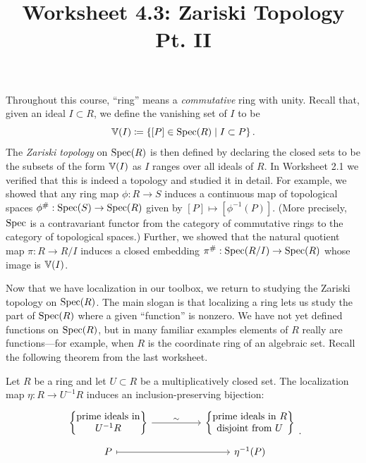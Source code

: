 \documentclass[12pt,reqno]{amsart}
\title{Worksheet 4.3: Zariski Topology Pt. II}
\begin{document}

\maketitle
\thispagestyle{firstpage2}

Throughout this course, ``ring'' means a \textit{commutative} ring with unity. Recall that, given an ideal $I \subset R$, we define the vanishing set of $I$ to be
\[
\mathbb{V}(I) \coloneqq \left\{[P] \in \operatorname{Spec}(R) \;\middle|\; I \subset P\right\}.
\]
The \emph{Zariski topology} on $\operatorname{Spec}(R)$ is then defined by declaring the closed sets to be the subsets of the form $\mathbb{V}(I)$ as $I$ ranges over all ideals of $R$. In Worksheet 2.1 we verified that this is indeed a topology and studied it in detail. For example, we showed that any ring map $\phi:R \to S$ induces a continuous map of topological spaces $\phi^{\#}: \operatorname{Spec}(S) \to \operatorname{Spec}(R)$ given by $[P] \mapsto [\phi^{-1}(P)]$. (More precisely, $\operatorname{Spec}$ is a contravariant functor from the category of commutative rings to the category of topological spaces.) Further, we showed that the natural quotient map $\pi:R \to R/I$ induces a closed embedding $\pi^{\#}:\operatorname{Spec}(R/I) \to \operatorname{Spec}(R)$ whose image is $\mathbb{V}(I)$.

Now that we have localization in our toolbox, we return to studying the Zariski topology on $\operatorname{Spec}(R)$. The main slogan is that localizing a ring lets us study the part of $\operatorname{Spec}(R)$ where a given ``function'' is nonzero. We have not yet defined functions on $\operatorname{Spec}(R)$, but in many familiar examples elements of $R$ really are functions—for example, when $R$ is the coordinate ring of an algebraic set. Recall the following theorem from the last worksheet.

\begin{theorem}\label{thm:localization-corr}
	Let $R$ be a ring and let $U \subset R$ be a multiplicatively closed set. The localization map $\eta:R \to U^{-1}R$ induces an inclusion-preserving bijection:
	\[
	\begin{tikzcd}[row sep = .5em, column sep = 5em]
	\left\{ 
	\begin{matrix}
	\text{prime ideals in} \\
	U^{-1}R
	\end{matrix}
	\right\} \arrow[r,"\sim"] & 
	\left\{
	\begin{matrix}
	\text{prime ideals in $R$} \\
	\text{disjoint from $U$} 
	\end{matrix}
	\right\} \\
	P \arrow[r, mapsto] & \eta^{-1}(P)
	\end{tikzcd}.
	\]
\end{theorem}
\end{document}
